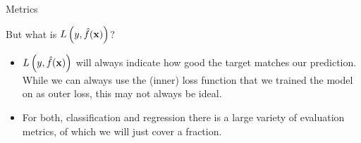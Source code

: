 \documentclass[11pt,compress,t,notes=noshow, xcolor=table]{beamer}
\begin{document}
\begin{vbframe}{Metrics}

But what is $L\left(y, \hat{f}(\mathbf{x})\right)$?


\begin{itemize}
\item $L\left(y, \hat{f}(\mathbf{x})\right)$ will always indicate how good the target matches our prediction.
While we can always use the (inner) loss function that we trained the model on as outer loss, this may not always be ideal.
\item For both, classification and regression there is a large variety of evaluation metrics, of which we will just cover a fraction.
\end{itemize}






\end{vbframe}







\end{document}
